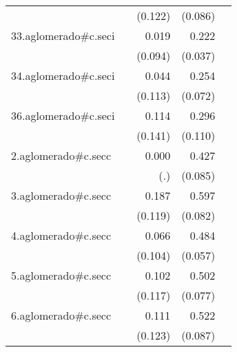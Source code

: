 {\begin{longtable}{l*{4}{D{.}{.}{-1}}}
            &                     &     (0.122)         &     (0.086)         &                     \\
\addlinespace
33.aglomerado#c.seci&                     &       0.019         &       0.222\sym{***}&                     \\
            &                     &     (0.094)         &     (0.037)         &                     \\
\addlinespace
34.aglomerado#c.seci&                     &       0.044         &       0.254\sym{***}&                     \\
            &                     &     (0.113)         &     (0.072)         &                     \\
\addlinespace
36.aglomerado#c.seci&                     &       0.114         &       0.296\sym{**} &                     \\
            &                     &     (0.141)         &     (0.110)         &                     \\
\addlinespace
2.aglomerado#c.secc&                     &       0.000         &       0.427\sym{***}&                     \\
            &                     &         (.)         &     (0.085)         &                     \\
\addlinespace
3.aglomerado#c.secc&                     &       0.187         &       0.597\sym{***}&                     \\
            &                     &     (0.119)         &     (0.082)         &                     \\
\addlinespace
4.aglomerado#c.secc&                     &       0.066         &       0.484\sym{***}&                     \\
            &                     &     (0.104)         &     (0.057)         &                     \\
\addlinespace
5.aglomerado#c.secc&                     &       0.102         &       0.502\sym{***}&                     \\
            &                     &     (0.117)         &     (0.077)         &                     \\
\addlinespace
6.aglomerado#c.secc&                     &       0.111         &       0.522\sym{***}&                     \\
            &                     &     (0.123)         &     (0.087)         &                     \\

\end{longtable}}
